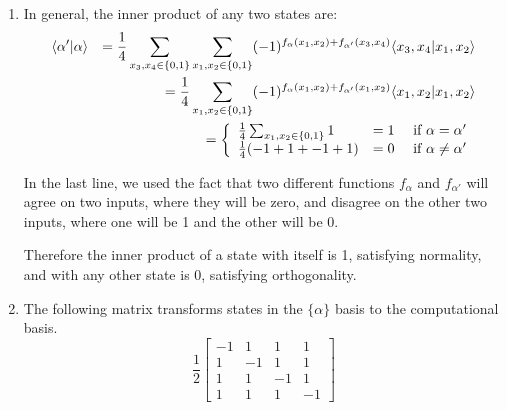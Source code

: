 \documentclass[12pt]{article}
\begin{document}
\begin{enumerate}
\item %
In general, the inner product of any two states are:
\begin{eqnarray*}
& \langle \alpha'|\alpha \rangle & = \frac{1}{4} \sum_{x_3,x_4 \in \{0,1\}}\sum_{x_1,x_2 \in \{0,1\}} (-1)^{f_{\alpha}(x_1,x_2)+f_{\alpha'}(x_3,x_4)}\langle x_3,x_4|x_1,x_2 \rangle\\
&                          & = \frac{1}{4} \sum_{x_1,x_2 \in \{0,1\}}(-1)^{f_{\alpha}(x_1,x_2)+f_{\alpha'}(x_1,x_2)}\langle x_1,x_2|x_1,x_2 \rangle\\
& & = \left\{ \begin{array}{lll}
\frac{1}{4} \sum_{x_1,x_2 \in \{0,1\}}1 & = 1 & \textrm{ if } \alpha = \alpha'\\
\frac{1}{4} (-1 + 1 + -1 + 1) & = 0 & \textrm{ if } \alpha \ne \alpha'
\end{array} \right.
\end{eqnarray*}

In the last line, we used the fact that two different functions $f_\alpha$
and $f_{\alpha'}$ will agree on two inputs, where they will be zero, and
disagree on the other two inputs, where one will be 1 and the other will be
0.

Therefore the inner product of a state with itself is 1, satisfying
normality, and with any other state is 0, satisfying orthogonality.

\item %
The following matrix transforms states in the  $\{\alpha\}$ basis to the
computational basis.
\begin{displaymath}
\frac{1}{2} \left[ \begin{array}{rrrr}
-1  &  1 &  1 &  1\\
 1  & -1 &  1 &  1\\
 1  &  1 & -1 &  1\\
 1  &  1 &  1 & -1
\end{array} \right]
\end{displaymath}


\end{enumerate}
\end{document}
